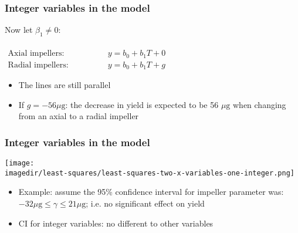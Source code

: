 \begin{frame}\frametitle{Integer variables in the model}
	
	Now let $\beta_1 \neq 0$:
	
	$ 
	\begin{array}{ll}
		& \\
		\text{Axial impellers:} \qquad &\qquad y = b_0 + b_1 T + 0 \\
		\text{Radial impellers:} \qquad &\qquad y = b_0 + b_1 T + g 
	\end{array}
	$
	\begin{itemize}
		\item	The lines are still parallel 
		\item	If $g = -56 \mu\text{g}$: the decrease in yield is expected to be 56 $\mu\text{g}$ when changing from an axial to a radial impeller 
	\end{itemize}
\end{frame}

\begin{frame}\frametitle{Integer variables in the model}
	\begin{center}
		\texttt{[image: \\imagedir/least-squares/least-squares-two-x-variables-one-integer.png]}
	\end{center}
	\begin{itemize}
		\item	Example: assume the 95\% confidence interval for impeller parameter was: $ -32 \mu\text{g} \leq \gamma \leq 21 \mu\text{g}$; i.e. no significant effect on yield 
		\item	CI for integer variables: no different to other variables 
	\end{itemize}
\end{frame}

